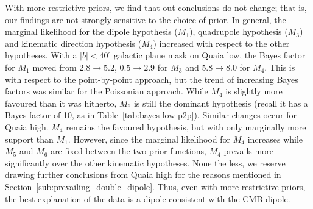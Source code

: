 \documentclass[fleqn,usenatbib]{mnras}
\begin{document}
        With more restrictive priors, we find that out conclusions do not change; that is, our findings are not strongly sensitive to the choice of prior.
        In general, the marginal likelihood for the dipole hypothesis ($M_1$), quadrupole hypothesis ($M_3$) and kinematic direction hypothesis ($M_4$) increased with respect to the other hypotheses.
        With a $|b| < 40^\circ$ galactic plane mask on Quaia low, the Bayes factor for $M_1$ moved from $2.8 \to 5.2$, $0.5 \to 2.9$ for $M_3$ and $5.8 \to 8.0$ for $M_4$.
        This is with respect to the point-by-point approach, but the trend of increasing Bayes factors was similar for the Poissonian approach.
        While $M_4$ is slightly more favoured than it was hitherto, $M_6$ is still the dominant hypothesis (recall it has a Bayes factor of 10, as in Table~\ref{tab:bayes-low-p2p}).
        Similar changes occur for Quaia high.
        $M_4$ remains the favoured hypothesis, but with only marginally more support than $M_1$.
        However, since the marginal likelihood for $M_4$ increases while $M_5$ and $M_6$ are fixed between the two prior functions, $M_4$ prevails more significantly over the other kinematic hypotheses.
        None the less, we reserve drawing further conclusions from Quaia high for the reasons mentioned in Section~\ref{sub:prevailing_double_dipole}.
        Thus, even with more restrictive priors, the best explanation of the data is a dipole consistent with the CMB dipole.
    
\end{document}
